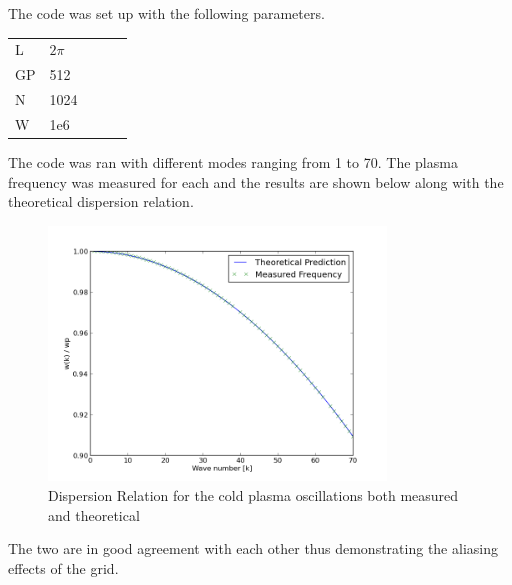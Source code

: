 \documentclass[12pt]{article}
\begin{document}
The code was set up with the following parameters. 
\begin{table}[h]
\begin{tabular}{lllll}
L  & ${2\pi}$      \\
GP & 512    \\
N  & 1024   \\
W  & 1e6   
\end{tabular}
\end{table} 
The code was ran with different modes ranging from 1 to 70. The plasma frequency was measured for each and the results are shown below along with the theoretical dispersion relation.
\begin{figure}[H]
\centering
\includegraphics[width=0.8\textwidth]{cold_results.png}
\caption{Dispersion Relation for the cold plasma oscillations both measured and theoretical}
\end{figure}
The two are in good agreement with each other thus demonstrating the aliasing effects of the grid.
\end{document}
